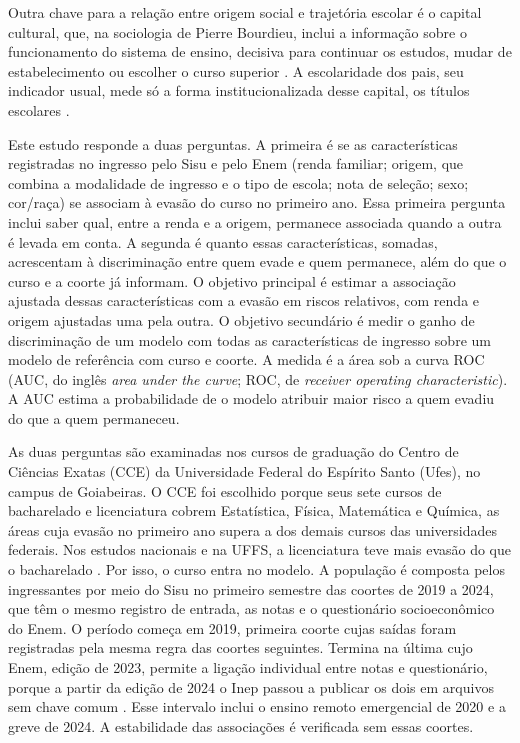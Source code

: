 \documentclass[12pt,a4paper]{article}
\begin{document}
Outra chave para a relação entre origem social e trajetória escolar é o capital cultural, que, na sociologia de Pierre Bourdieu, inclui a informação sobre o funcionamento do sistema de ensino, decisiva para continuar os estudos, mudar de estabelecimento ou escolher o curso superior \citep{bourdieuPasseronReproducao,nogueira2002sociologia}. A escolaridade dos pais, seu indicador usual, mede só a forma institucionalizada desse capital, os títulos escolares \citep{nogueira2002sociologia}.

Este estudo responde a duas perguntas. A primeira é se as características registradas no ingresso pelo Sisu e pelo Enem (renda familiar; origem, que combina a modalidade de ingresso e o tipo de escola; nota de seleção; sexo; cor/raça) se associam à evasão do curso no primeiro ano. Essa primeira pergunta inclui saber qual, entre a renda e a origem, permanece associada quando a outra é levada em conta. A segunda é quanto essas características, somadas, acrescentam à discriminação entre quem evade e quem permanece, além do que o curso e a coorte já informam. O objetivo principal é estimar a associação ajustada dessas características com a evasão em riscos relativos, com renda e origem ajustadas uma pela outra. O objetivo secundário é medir o ganho de discriminação de um modelo com todas as características de ingresso sobre um modelo de referência com curso e coorte. A medida é a área sob a curva ROC (AUC, do inglês \textit{area under the curve}; ROC, de \textit{receiver operating characteristic}). A AUC estima a probabilidade de o modelo atribuir maior risco a quem evadiu do que a quem permaneceu.

As duas perguntas são examinadas nos cursos de graduação do Centro de Ciências Exatas (CCE) da Universidade Federal do Espírito Santo (Ufes), no campus de Goiabeiras. O CCE foi escolhido porque seus sete cursos de bacharelado e licenciatura cobrem Estatística, Física, Matemática e Química, as áreas cuja evasão no primeiro ano supera a dos demais cursos das universidades federais. Nos estudos nacionais e na UFFS, a licenciatura teve mais evasão do que o bacharelado \citep{gomesDeterminantesEvasaoNo2024,paulaDESIGUALDADESAPOSACESSO2024,nierotkaAcessoEvasaoConclusao2023}. Por isso, o curso entra no modelo. A população é composta pelos ingressantes por meio do Sisu no primeiro semestre das coortes de 2019 a 2024, que têm o mesmo registro de entrada, as notas e o questionário socioeconômico do Enem. O período começa em 2019, primeira coorte cujas saídas foram registradas pela mesma regra das coortes seguintes. Termina na última cujo Enem, edição de 2023, permite a ligação individual entre notas e questionário, porque a partir da edição de 2024 o Inep passou a publicar os dois em arquivos sem chave comum \citep{inep2025leiame}. Esse intervalo inclui o ensino remoto emergencial de 2020 e a greve de 2024. A estabilidade das associações é verificada sem essas coortes.
\end{document}
